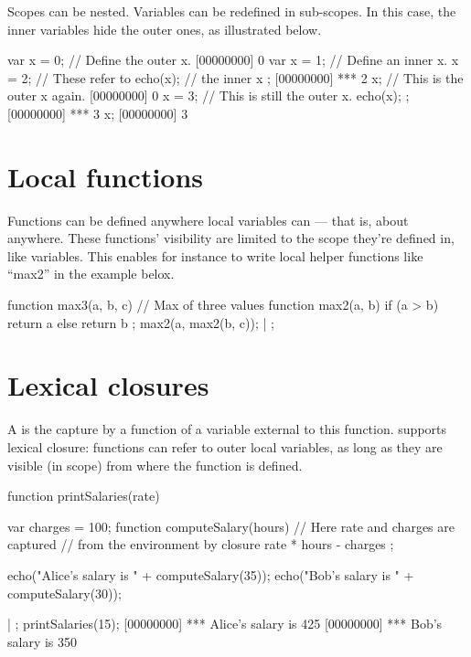 Scopes can be nested. Variables can be redefined in sub-scopes. In
this case, the inner variables hide the outer ones, as illustrated
below.

\begin{urbiscript}
var x = 0;   // Define the outer x.
[00000000] 0
{
  var x = 1; // Define an inner x.
  x = 2;     // These refer to
  echo(x);   // the inner x
};
[00000000] *** 2
x;           // This is the outer x again.
[00000000] 0
{
  x = 3;     // This is still the outer x.
  echo(x);
};
[00000000] *** 3
x;
[00000000] 3
\end{urbiscript}

\section{Local functions}

Functions can be defined anywhere local variables can --- that is,
about anywhere. These functions' visibility are limited to the scope
they're defined in, like variables. This enables for instance to write
local helper functions like ``max2'' in the example belox.

\begin{urbiscript}
function max3(a, b, c) // Max of three values
{
  function max2(a, b)
  {
    if (a > b)
      return a
    else
      return b
  };
  max2(a, max2(b, c));
} | {};
\end{urbiscript}

\section{Lexical closures}

A  is the capture by a function of a variable external to this
function. \us supports lexical closure: functions can refer to outer
local variables, as long as they are visible (in scope) from where
the function is defined.

\begin{urbiscript}
function printSalaries(rate)
{
  var charges = 100;
  function computeSalary(hours)
  {
    // Here rate and charges are captured
    // from the environment by closure
    rate * hours - charges
  };

  echo("Alice's salary is " + computeSalary(35));
  echo("Bob's salary is " + computeSalary(30));
} | {};
printSalaries(15);
[00000000] *** Alice's salary is 425
[00000000] *** Bob's salary is 350
\end{urbiscript}

